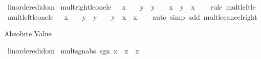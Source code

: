 \begin{isabellebody}
%
\endisadelimproof
\isanewline
{}\isamarkupfalse%
\isanewline
\isanewline
{}\isamarkupfalse%
\ linordered{\isacharunderscore}{\kern0pt}idom\isanewline
{}\isanewline
\isanewline
{}\isamarkupfalse%
\ mult{\isacharunderscore}{\kern0pt}right{\isacharunderscore}{\kern0pt}le{\isacharunderscore}{\kern0pt}one{\isacharunderscore}{\kern0pt}le{\isacharcolon}{\kern0pt}\ {\isachardoublequoteopen}{}\ {\isasymle}\ x\ {\isasymLongrightarrow}\ {}\ {\isasymle}\ y\ {\isasymLongrightarrow}\ y\ {\isasymle}\ {}\ {\isasymLongrightarrow}\ x\ {\isacharasterisk}{\kern0pt}\ y\ {\isasymle}\ x{\isachardoublequoteclose}\isanewline
%
\isadelimproof
\ \ %
\endisadelimproof
%
\isatagproof
{}\isamarkupfalse%
\ {\isacharparenleft}{\kern0pt}rule\ mult{\isacharunderscore}{\kern0pt}left{\isacharunderscore}{\kern0pt}le{\isacharparenright}{\kern0pt}%
\endisatagproof
{\isafoldproof}%
%
\isadelimproof
\isanewline
%
\endisadelimproof
\isanewline
{}\isamarkupfalse%
\ mult{\isacharunderscore}{\kern0pt}left{\isacharunderscore}{\kern0pt}le{\isacharunderscore}{\kern0pt}one{\isacharunderscore}{\kern0pt}le{\isacharcolon}{\kern0pt}\ {\isachardoublequoteopen}{}\ {\isasymle}\ x\ {\isasymLongrightarrow}\ {}\ {\isasymle}\ y\ {\isasymLongrightarrow}\ y\ {\isasymle}\ {}\ {\isasymLongrightarrow}\ y\ {\isacharasterisk}{\kern0pt}\ x\ {\isasymle}\ x{\isachardoublequoteclose}\isanewline
%
\isadelimproof
\ \ %
\endisadelimproof
%
\isatagproof
{}\isamarkupfalse%
\ {\isacharparenleft}{\kern0pt}auto\ simp\ add{\isacharcolon}{\kern0pt}\ mult{\isacharunderscore}{\kern0pt}le{\isacharunderscore}{\kern0pt}cancel{\isacharunderscore}{\kern0pt}right{}{\isacharparenright}{\kern0pt}%
\endisatagproof
{\isafoldproof}%
%
\isadelimproof
\isanewline
%
\endisadelimproof
\isanewline
{}\isamarkupfalse%
%
\begin{isamarkuptext}%
Absolute Value%
\end{isamarkuptext}\isamarkuptrue%
\isamarkupfalse%
\ linordered{\isacharunderscore}{\kern0pt}idom\isanewline
{}\isanewline
\isanewline
{}\isamarkupfalse%
\ mult{\isacharunderscore}{\kern0pt}sgn{\isacharunderscore}{\kern0pt}abs{\isacharcolon}{\kern0pt}\ {\isachardoublequoteopen}sgn\ x\ {\isacharasterisk}{\kern0pt}\ {\isasymbar}x{\isasymbar}\ {\isacharequal}{\kern0pt}\ x{\isachardoublequoteclose}\isanewline
%
\isadelimproof
\ \ %
\endisadelimproof
%
\isatagproof
{}\isamarkupfalse%

\end{isabellebody}
